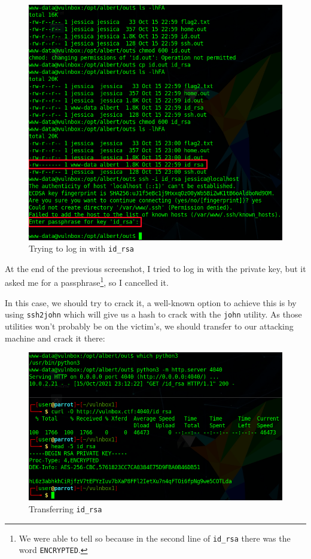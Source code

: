 \documentclass[12pt]{article}
\begin{document}
    \begin{figure}[H]\label{pic:56-ssh-id_rsa}
        \centering
        \includegraphics[width=1.00\textwidth]{56-ssh-id_rsa.png}
        \caption{Trying to log in with \texttt{id\_rsa}}
    \end{figure}

    At the end of the previous screenshot, I tried to log in with the private
    key, but it asked me for a passphrase\footnote{We were able to tell so
    because in the second line of \texttt{id\_rsa} there was the word
    \texttt{ENCRYPTED}.}, so I cancelled it.

    In this case, we should try to crack it, a well-known option to achieve this
    is by using \verb!ssh2john! which will give us a hash to crack with the
    \texttt{john} utility. As those utilities won't probably be on the victim's,
    we should transfer to our attacking machine and crack it there:

    \begin{figure}[H]\label{pic:57-transfer-id_rsa}
        \centering
        \includegraphics[width=1.00\textwidth]{57-transfer-id_rsa.png}
        \caption{Transferring \texttt{id\_rsa}}
    \end{figure}
\end{document}
